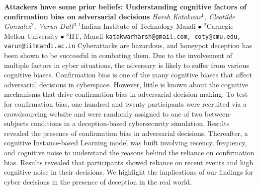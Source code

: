 
    \begin{conf-abstract}[]
        {\textbf{Attackers have some prior beliefs: Understanding cognitive factors of confirmation bias on adversarial decisions}}
        {\textit{Harsh Katakwar$^{1}$, Cleotilde Gonzalez$^{2}$, Varun Dutt$^{3}$}}
        {$^{1}$Indian Institute of Technology Mandi $\bullet$ $^{2}$Carnegie Mellon University $\bullet$ $^{3}$IIT, Mandi}
        {\texttt{katakwarharsh@gmail.com, coty@cmu.edu, varun@iitmandi.ac.in}}
        {Cyberattacks are hazardous, and honeypot deception has been shown to be successful in combating them. Due to the involvement of multiple factors in cyber situations, the adversary is likely to suffer from various cognitive biases. Confirmation bias is one of the many cognitive biases that affect adversarial decisions in cyberspace. However, little is known about the cognitive mechanisms that drive confirmation bias in adversarial decision-making. To test for confirmation bias, one hundred and twenty participants were recruited via a crowdsourcing website and were randomly assigned to one of two between-subjects conditions in a deception-based cybersecurity simulation. Results revealed the presence of confirmation bias in adversarial decisions. Thereafter, a cognitive Instance-based Learning model was built involving recency, frequency, and cognitive noise to understand the reasons behind the reliance on confirmation bias. Results revealed that participants showed reliance on recent events and high cognitive noise in their decisions. We highlight the implications of our findings for cyber decisions in the presence of deception in the real world.}
    \end{conf-abstract}
        